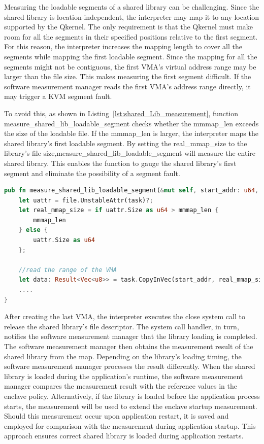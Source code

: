 Measuring the loadable segments of a shared library can be challenging. Since the shared library is location-independent, the interpreter may map it to any location supported by the Qkernel. The only requirement is that the Qkernel must make room for all the segments in their specified positions 
relative to the first segment. For this reason, the interpreter increases the mapping length to cover all the segments while mapping the first loadable segment. Since the mapping for all the segments might not be contiguous, the first VMA's virtual address range may be larger than the file size. 
This makes measuring the first segment difficult. If the software measurement manager reads the first VMA's address range directly, it may trigger a KVM segment fault. 

To avoid this,  as shown in Listing~\ref{lst:shared_Lib_measurement}, function measure\_shared\_lib\_loadable\_segment checks whether the mmmap\_len exceeds the size of the loadable file. If the mmmap\_len is larger, the interpreter maps the shared library's first loadable segment. By 
setting the real\_mmap\_size to the library's file size,measure\_shared\_lib\_loadable\_segment will measure the entire shared library. This enables the function to gauge the shared library's first segment and eliminate the possibility of a segment fault.

\begin{lstlisting}[language=rust, caption= Interface for accessing the file type secrets, label={lst:shared_Lib_measurement}]
pub fn measure_shared_lib_loadable_segment(&mut self, start_addr: u64, file: &File, task: &Task, fixed: bool, mmmap_len: u64, offset: u64, file_name: String) -> Result<()> {
    let uattr = file.UnstableAttr(task)?;
    let real_mmap_size = if uattr.Size as u64 > mmmap_len {
        mmmap_len
    } else {
        uattr.Size as u64
    };
    
    //read the range of the VMA
    let data: Result<Vec<u8>> = task.CopyInVec(start_addr, real_mmap_size as usize);
    ....
}
\end{lstlisting}
After creating the last VMA, the interpreter executes the close system call to release the shared library's file descriptor. The system call handler, in turn, notifies the software measurement manager that the library loading is completed. The software measurement manager then obtains the measurement 
result of the shared library from the map. Depending on the library's loading timing, the software measurement manager processes the result differently. When the shared library is loaded during the application's runtime, the software measurement manager compares the measurement result with the 
reference values in the enclave policy. Alternatively, if the library is loaded before the application process starts, the measurement will be used to extend the enclave startup measurement. Should this measurement occur upon application restart, it is saved and employed for comparison with the 
measurement during application startup. This approach ensures correct shared library is loaded during application restarts.

